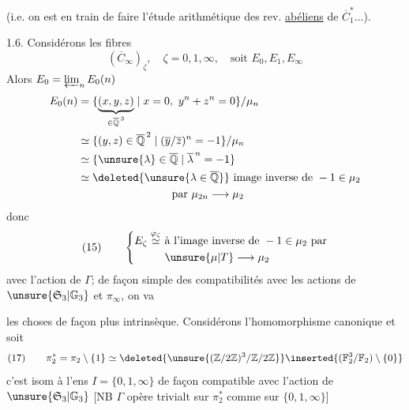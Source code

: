 (i.e. on est en train de faire l'étude arithmétique des rev.
 \uline{abéliens} de $\overline C_1^*\ldots$).

1.6. Considérons les fibres
\[
(\overline C_\infty)_\zeta,\quad\zeta=0,1,\infty,\quad\text{soit }E_0,E_1,E_\infty
\]
Alors $E_0=\varprojlim_n E_0(n)$
\[
\begin{aligned}
E_0(n)&=\{\underbrace{(x,y,z)}_{\in\overline{\mathbb Q}^{\,3}}\mid x=0,\ y^n+z^n=0\}/\mu_n\\
&\simeq\{(y,z)\in\overline{\mathbb Q}^{\,2}\mid(\overline y/\overline z)^n=-1\}/\mu_n\\
&\simeq\{\unsure{\lambda}\in\overline{\mathbb Q}\mid\overline\lambda^{\,n}=-1\}\\
&\simeq\deleted{\unsure{\lambda\in\overline{\mathbb Q}}}\ \text{image inverse de }-1\in\mu_2\\
&\hspace{3cm}\text{par }\mu_{2n}\longrightarrow\mu_2
\end{aligned}
\]
donc
\[
(15)\qquad\left\{\begin{aligned}
E_\zeta\overset{\varphi_\zeta}{\simeq}\ &\text{à l'image inverse de }-1\in\mu_2\text{ par}\\
&\unsure{\mu|T}\longrightarrow\mu_2
\end{aligned}\right.
\]
avec l'action de  $\Gamma$;
 de façon simple des compatibilités avec les actions de
$\unsure{\mathfrak S_3|\mathbb G_3}$ et $\pi_\infty$, on va 

les choses de façon plus intrinsèque. Considérons l'homomorphisme canonique
et soit
\[
(17)\qquad\pi_2^*=\pi_2\setminus\{1\}\simeq
\deleted{\unsure{(\mathbb Z/2\mathbb Z)^3/\mathbb Z/2\mathbb Z}}
\inserted{(\mathbb F_2^3/\mathbb F_2)\setminus\{0\}}
\]
c'est isom à l'ens $I=\{0,1,\infty\}$ de façon compatible avec l'action de
$\unsure{\mathfrak S_3|\mathbb G_3}$ [NB $\Gamma$ opère trivialt sur $\pi_2^*$
comme sur  $\{0,1,\infty\}$]

